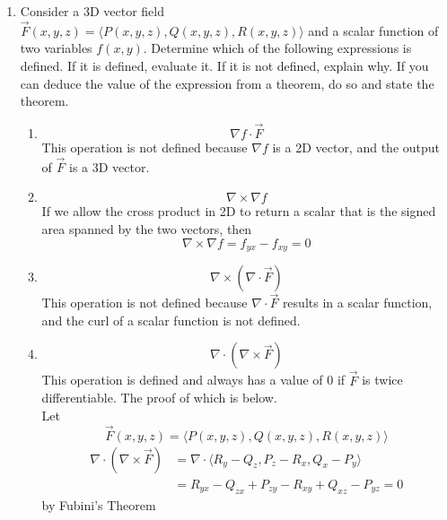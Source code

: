 \begin{enumerate}
	\item Consider a 3D vector field $\vec{F}(x,y,z) = \langle P(x,y,z), Q(x,y,z), R(x,y,z) \rangle$ and a scalar function of two variables $f(x,y)$. Determine which of the following expressions is defined. If it is defined, evaluate it. If it is not defined, explain why. If you can deduce the value of the expression from a theorem, do so and state the theorem.
	\begin{enumerate}[label=\alph*.]
		\item \begin{equation*}
			\nabla f \cdot \vec{F}
		\end{equation*}
		This operation is not defined because $\nabla f$ is a 2D vector, and the output of $\vec{F}$ is a 3D vector.\\
		
		\item \begin{equation*}
			\nabla \times \nabla f
		\end{equation*}
		If we allow the cross product in 2D to return a scalar that is the signed area spanned by the two vectors, then
		\begin{equation*}
			\nabla \times \nabla f = f_{yx} - f_{xy} = 0
		\end{equation*}
		
		\item \begin{equation*}
			\nabla\times(\nabla\cdot\vec{F})	
		\end{equation*}
		This operation is not defined because $\nabla \cdot \vec{F}$ results in a scalar function, and the curl of a scalar function is not defined.\\
		
		\item \begin{equation*}
			\nabla \cdot (\nabla \times \vec{F})	
		\end{equation*}
		This operation is defined and always has a value of 0 if $\vec{F}$ is twice differentiable. The proof of which is below.\\
		Let 
		\begin{equation*}
			\vec{F}(x,y,z) = \langle P(x,y,z), Q(x,y,z), R(x,y,z) \rangle	
		\end{equation*}
		\begin{align*}
			\nabla \cdot (\nabla \times \vec{F}) &= \nabla \cdot \langle R_y-Q_z, P_z-R_x, Q_x-P_y \rangle \\
			&= R_{yx}-Q_{zx} + P_{zy}-R_{xy} + Q_{xz}-P_{yz} = 0
		\end{align*}
		by Fubini's Theorem\\
	\end{enumerate}


\end{enumerate}
